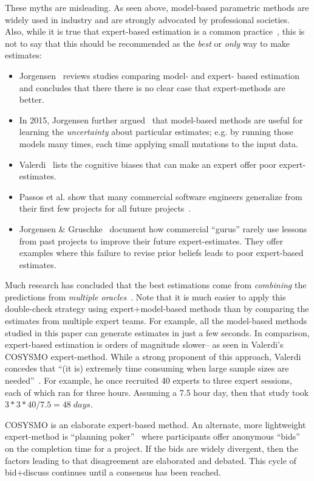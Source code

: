 \documentclass[smallcondesed]{svjour3}
\newcommand{\bi}{\begin{itemize}[leftmargin=0.4cm]}
\newcommand{\ei}{\end{itemize}}
\begin{document}
These myths are misleading.
As seen above,  model-based
parametric methods are  widely used in industry and
are strongly advocated by professional societies.
Also, 
while it is true that expert-based estimation is a common practice~\cite{boehm00a}, this is not to say that this should be recommended as the {\em best} or {\em only} way to make estimates:
\bi 
\item
Jorgensen~\cite{Jorgensen2004} reviews studies 
comparing  model- and expert- based estimation and concludes that there
there is no clear case that expert-methods are better.
\item
In 2015, Jorgensen further argued~\cite{jorg15} that   model-based methods are useful for learning the  {\em uncertainty}
about particular estimates; e.g.
by running those models many times, 
each time applying
small mutations to the input data.
\item 
Valerdi~\cite{valerdi11} lists the
cognitive biases that can make an expert offer poor expert-estimates.
\item Passos et al. show that many
commercial software engineers generalize from their
first few projects for all future
projects~\cite{passos11}.
\item
Jorgensen \& Gruschke~\cite{jorgensen09} document how
  commercial  ``gurus'' rarely use lessons
  from past projects to improve their future expert-estimates. 
 They offer examples where this
  failure to revise prior beliefs   leads to poor
 expert-based estimates.
  \ei 
Much research has concluded that the best estimations come from {\em combining} the predictions
from {\em multiple oracles}~\cite{koc11a,chulani99,baker07,valerdi11}.  
Note that it is much easier to apply this double-check strategy using expert+model-based methods 
than by comparing the estimates from multiple expert teams.
For example, all the model-based methods  studied in this paper can generate estimates
in just a few seconds. In comparison, expert-based estimation is orders of magnitude slower-- as seen in  
Valerdi's  
COSYSMO expert-method.
While a strong proponent of this approach, Valerdi concedes that 
``(it is)  extremely time
consuming when large sample sizes are needed''~\cite{valerdi11}.
For example, he once
recruited 40 experts to three expert sessions, each of which ran for three hours.
Assuming a 7.5 hour day,
then that study took $3*3*40 /7.5 = 48\; \mathit{days}$.

COSYSMO is an elaborate expert-based method. An alternate, more lightweight expert-method is  ``planning poker''~\cite{molokk08} where
participants offer anonymous
``bids'' on the 
completion time for a project. If  the bids are widely divergent, then the factors
leading to that disagreement are elaborated and debated. This cycle of bid+discuss continues
until a consensus has been reached.
\end{document}
